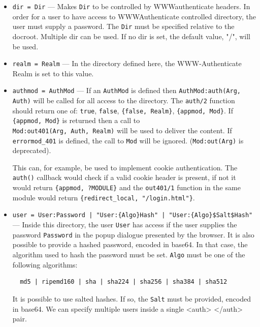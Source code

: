 \documentclass[11pt,oneside,english]{book}
\begin{document}
\begin{itemize}
\begin{itemize}
              \item \verb+dir = Dir+ --- Makes \verb+Dir+ to be controlled by
                WWW\-authenticate headers. In order for a user to have access to
                WWW\-Authenticate controlled directory, the user must supply a
                password. The \verb+Dir+ must be specified relative to the
                docroot. Multiple dir can be used. If no dir is set, the default
                value, "/", will be used.

              \item \verb+realm = Realm+ --- In the directory defined here, the
                WWW-Authenticate Realm is set to this value.

              \item \verb+authmod = AuthMod+ --- If an \verb+AuthMod+ is defined
                then \verb+AuthMod:auth(Arg, Auth)+ will be called for all
                access to the directory. The \verb+auth/2+ function should
                return one of: \verb+true+, \verb+false+, \verb+{false, Realm}+,
                \verb+{appmod, Mod}+. If \verb+{appmod, Mod}+ is returned then a
                call to\\ \verb+Mod:out401(Arg, Auth, Realm)+ will be used to
                deliver the content. If \verb+errormod_401+ is defined, the call
                to \verb+Mod+ will be ignored. (\verb+Mod:out(Arg)+ is
                deprecated).

                This can, for example, be used to implement cookie
                authentication. The \verb+auth()+ callback would check if a
                valid cookie header is present, if not it would return
                \verb+{appmod, ?MODULE}+ and the \verb+out401/1+ function in the
                same module would return \verb+{redirect_local, "/login.html"}+.

              \item \verb+user = User:Password | "User:{Algo}Hash" | "User:{Algo}$Salt$Hash"+ ---
                Inside this directory, the user \verb+User+ has access if the
                user supplies the password \verb+Password+ in the popup dialogue
                presented by the browser. It is also possible to provide a
                hashed password, encoded in base64. In that case, the algorithm
                used to hash the password must be set. \verb+Algo+ must be one
                of the following algorithms:
\begin{verbatim}
  md5 | ripemd160 | sha | sha224 | sha256 | sha384 | sha512
\end{verbatim}
                It is possible to use salted hashes. If so, the \verb+Salt+ must
                be provided, encoded in base64. We can specify multiple users
                inside a single <auth> </auth> pair.


\end{itemize}
\end{itemize}
\end{document}
